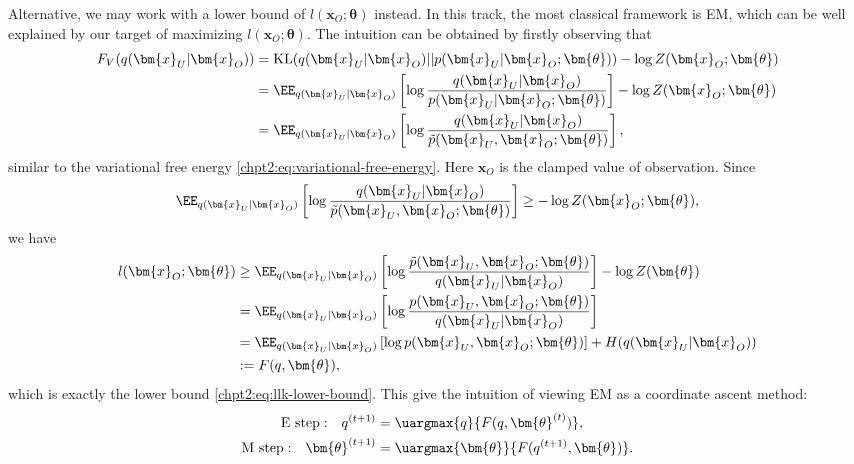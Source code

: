 Alternative, we may work with a lower bound of $l(\bm{x}_O; \bm{\theta})$ instead. In this track, the most classical framework is EM, which can be well explained by our target of maximizing $l(\bm{x}_O; \bm{\theta})$. The intuition can be obtained by firstly observing that
\begin{align}
  F_V(q(\bm{x}_U|\bm{x}_O)) & = \mathrm{KL}(q(\bm{x}_U|\bm{x}_O) || p(\bm{x}_U|\bm{x}_O; \bm{\theta})) - \log{Z(\bm{x}_O; \bm{\theta})} \nonumber \\
                            &= \EE_{q(\bm{x}_U|\bm{x}_O)}\left[  \log{\frac{q(\bm{x}_U|\bm{x}_O)}{{p}(\bm{x}_U| \bm{x}_O; \bm{\theta})}} \right] - \log{Z(\bm{x}_O;\bm{\theta})} \nonumber \\
                            &= \EE_{q(\bm{x}_U|\bm{x}_O)}\left[ \log{\frac{q(\bm{x}_U|\bm{x}_O)}{\tilde{p}(\bm{x}_U, \bm{x}_O; \bm{\theta})}} \right],
\end{align}
similar to the variational free energy \eqref{chpt2:eq:variational-free-energy}. Here $\bm{x}_O$ is the clamped value of observation. Since
\begin{equation}
  \EE_{q(\bm{x}_U|\bm{x}_O)}\left[ \log{\frac{q(\bm{x}_U|\bm{x}_O)}{\tilde{p}(\bm{x}_U, \bm{x}_O; \bm{\theta})}} \right] \geq - \log{Z(\bm{x}_O; \bm{\theta})},
\end{equation}
we have
\begin{align}\label{chpt5:eq:lower-bound-F}
  l(\bm{x}_O; \bm{\theta}) &\geq \EE_{q(\bm{x}_U|\bm{x}_O)}\left[ \log{\frac{\tilde{p}(\bm{x}_U, \bm{x}_O; \bm{\theta})}{q(\bm{x}_U|\bm{x}_O)}} \right] - \log{Z(\bm{\theta})} \nonumber \\
                           & = \EE_{q(\bm{x}_U|\bm{x}_O)}\left[ \log{\frac{{p}(\bm{x}_U, \bm{x}_O; \bm{\theta})}{q(\bm{x}_U|\bm{x}_O)}} \right] \nonumber \\
                           & = \EE_{q(\bm{x}_U|\bm{x}_O)}\left[ \log{{p}(\bm{x}_U, \bm{x}_O; \bm{\theta})} \right] + H({q(\bm{x}_U|\bm{x}_O)}) \nonumber \\
                           & := F(q, \bm{\theta}),
\end{align}
which is exactly the lower bound \eqref{chpt2:eq:llk-lower-bound}. This give the intuition of viewing EM as a coordinate ascent method:
\begin{align}
  \mathrm{E~step:}~~~ q^{(t+1)} &= \uargmax{q}{F(q, \bm{\theta}^{(t)})}, \\
  \mathrm{M~step:}~~~\bm{\theta}^{(t+1)} &= \uargmax{\bm{\theta}}{F(q^{(t+1)}, \bm{\theta})}.
\end{align}

